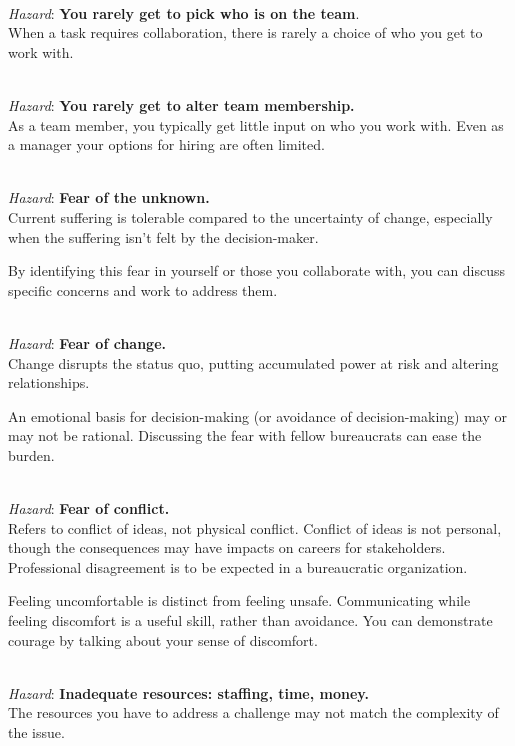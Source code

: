 \ \\
\textit{Hazard}: \textbf{You rarely get to pick who is on the team}. \\
When a task requires collaboration, there is rarely a choice of who you get to work with. 

\ \\
\textit{Hazard}: \textbf{You rarely get to alter team membership.}\\
As a team member, you typically get little input on who you work with. Even as a manager your options for hiring are often limited. 

\ \\
\textit{Hazard}: \textbf{Fear of the unknown.}\\
Current suffering is tolerable compared to the uncertainty of change, especially when the suffering isn't felt by the decision-maker.

By identifying this fear in yourself or those you collaborate with, you can discuss specific concerns and work to address them.

\ \\
\textit{Hazard}: \textbf{Fear of change.} \\
Change disrupts the status quo, putting accumulated power at risk and altering relationships. 

An emotional basis for decision-making (or avoidance of decision-making) may or may not be rational. Discussing the fear with fellow bureaucrats can ease the burden. 

\ \\
\textit{Hazard}: \textbf{Fear of conflict.}\\
Refers to conflict of ideas, not physical conflict. Conflict of ideas is not personal, though the consequences may have impacts on careers for stakeholders. \\
Professional disagreement is to be expected in a bureaucratic organization.

Feeling uncomfortable is distinct from feeling unsafe. Communicating while feeling discomfort is a useful skill, rather than avoidance. You can demonstrate courage by talking about your sense of discomfort. 

\ \\
\textit{Hazard}: \textbf{Inadequate resources: staffing, time, money.}\\
The resources you have to address a challenge may not match the complexity of the issue.

